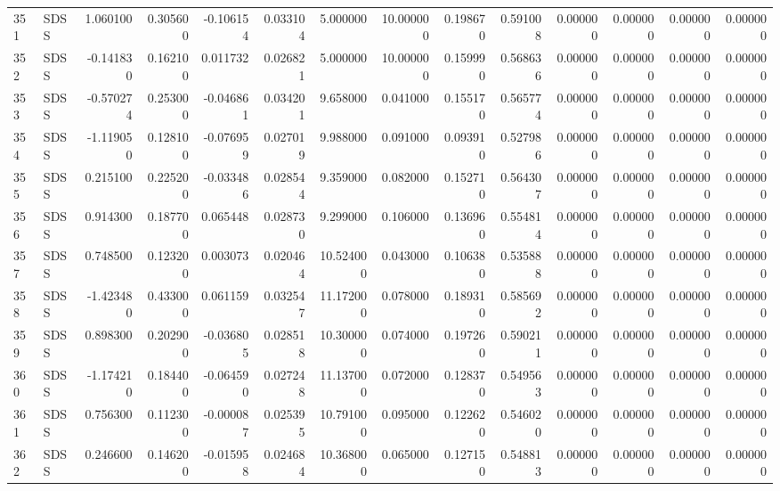 \begin{tabular}{llrrrrrrrrrrrr}
351 &   SDSS &  1.060100 &      0.305600 & -0.106154 &    0.033104 &   5.000000 &     10.000000 &   0.198670 &  0.591008 &  0.000000 &   0.000000 &     0.000000 &     0.000000 \\
352 &   SDSS & -0.141830 &      0.162100 &  0.011732 &    0.026821 &   5.000000 &     10.000000 &   0.159990 &  0.568636 &  0.000000 &   0.000000 &     0.000000 &     0.000000 \\
353 &   SDSS & -0.570274 &      0.253000 & -0.046861 &    0.034201 &   9.658000 &      0.041000 &   0.155170 &  0.565774 &  0.000000 &   0.000000 &     0.000000 &     0.000000 \\
354 &   SDSS & -1.119050 &      0.128100 & -0.076959 &    0.027019 &   9.988000 &      0.091000 &   0.093910 &  0.527986 &  0.000000 &   0.000000 &     0.000000 &     0.000000 \\
355 &   SDSS &  0.215100 &      0.225200 & -0.033486 &    0.028544 &   9.359000 &      0.082000 &   0.152710 &  0.564307 &  0.000000 &   0.000000 &     0.000000 &     0.000000 \\
356 &   SDSS &  0.914300 &      0.187700 &  0.065448 &    0.028730 &   9.299000 &      0.106000 &   0.136960 &  0.554814 &  0.000000 &   0.000000 &     0.000000 &     0.000000 \\
357 &   SDSS &  0.748500 &      0.123200 &  0.003073 &    0.020464 &  10.524000 &      0.043000 &   0.106380 &  0.535888 &  0.000000 &   0.000000 &     0.000000 &     0.000000 \\
358 &   SDSS & -1.423480 &      0.433000 &  0.061159 &    0.032547 &  11.172000 &      0.078000 &   0.189310 &  0.585692 &  0.000000 &   0.000000 &     0.000000 &     0.000000 \\
359 &   SDSS &  0.898300 &      0.202900 & -0.036805 &    0.028518 &  10.300000 &      0.074000 &   0.197260 &  0.590211 &  0.000000 &   0.000000 &     0.000000 &     0.000000 \\
360 &   SDSS & -1.174210 &      0.184400 & -0.064590 &    0.027248 &  11.137000 &      0.072000 &   0.128370 &  0.549563 &  0.000000 &   0.000000 &     0.000000 &     0.000000 \\
361 &   SDSS &  0.756300 &      0.112300 & -0.000087 &    0.025395 &  10.791000 &      0.095000 &   0.122620 &  0.546020 &  0.000000 &   0.000000 &     0.000000 &     0.000000 \\
362 &   SDSS &  0.246600 &      0.146200 & -0.015958 &    0.024684 &  10.368000 &      0.065000 &   0.127150 &  0.548813 &  0.000000 &   0.000000 &     0.000000 &     0.000000 \\

\end{tabular}
